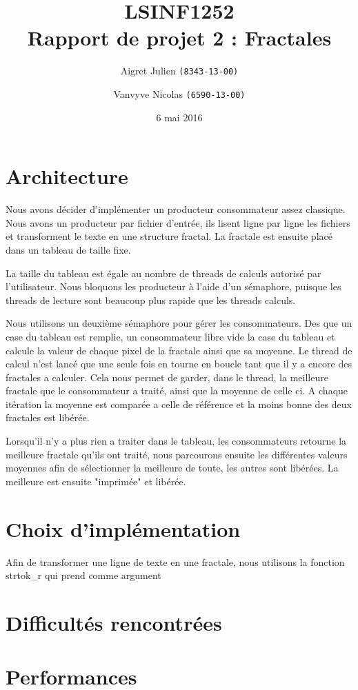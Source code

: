 \documentclass[10pt,a4paper]{article}
\author{Aigret Julien \texttt{(8343-13-00)}\and Vanvyve Nicolas \texttt{(6590-13-00)}}
\date{6 mai 2016}
\title{LSINF1252\\Rapport de projet 2 : Fractales}
\begin{document}
\maketitle


\section{Architecture}

Nous avons décider d'implémenter un producteur consommateur assez classique. Nous avons un producteur par fichier d'entrée, ils lisent ligne par ligne les fichiers et transforment  le texte en une structure fractal. La fractale est ensuite placé dans un tableau de taille fixe.

La taille du tableau est égale au nombre de threads de calculs autorisé par l'utilisateur. Nous bloquons les producteur à l'aide d'un sémaphore, puisque les threads de lecture sont beaucoup plus rapide que les threads calculs.

Nous utilisons un deuxième sémaphore pour gérer les consommateurs. Des que un case du tableau est remplie, un consommateur libre vide la case du tableau et calcule la valeur de chaque pixel de la fractale ainsi que sa moyenne.
Le thread de calcul n'est lancé que une seule fois en tourne en boucle tant que il y a encore des fractales a calculer. Cela nous permet de garder, dans le thread, la meilleure fractale que le consommateur a traité, ainsi que la moyenne de celle ci.
A chaque itération la moyenne est comparée a celle de référence et la moins bonne des deux fractales est libérée.

Lorsqu'il n'y a plus rien a traiter dans le tableau, les consommateurs retourne la meilleure fractale qu'ils ont traité, nous parcourons ensuite les différentes valeurs moyennes afin de sélectionner la meilleure de toute, les autres sont libérées. La meilleure est ensuite "imprimée" et libérée.
 
\section{Choix d'implémentation}

Afin de transformer une ligne de texte en une fractale, nous utilisons la fonction strtok_r qui prend comme argument



\section{Difficultés rencontrées}

\section{Performances}
\end{document}
